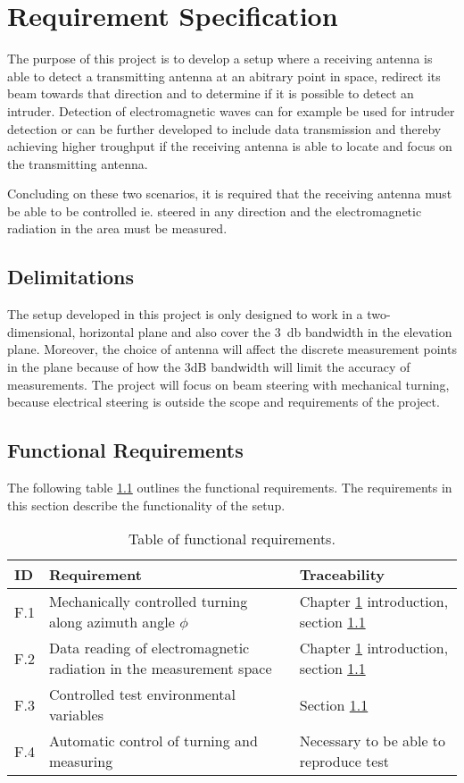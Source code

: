 \chapter{Requirement Specification} \label{ch:req}
The purpose of this project is to develop a setup where a receiving antenna is able to detect a transmitting antenna at an abitrary point in space, redirect its beam towards that direction and to determine if it is possible to detect an intruder. Detection of electromagnetic waves can for example be used for intruder detection or can be further developed to include data transmission and thereby achieving higher troughput if the receiving antenna is able to locate and focus on the transmitting antenna. 

Concluding on these two scenarios, it is required that the receiving antenna must be able to be controlled ie. steered in any direction and the electromagnetic radiation in the area must be measured. 

\section{Delimitations} \label{sec:delimitations}
The setup developed in this project is only designed to work in a two-dimensional, horizontal plane and also cover the \SI{3}{\decibel} bandwidth in the elevation plane. Moreover, the choice of antenna will affect the discrete measurement points in the plane because of how the 3dB bandwidth will limit the accuracy of measurements. The project will focus on beam steering with mechanical turning, because electrical steering is outside the scope and requirements of the project.

\section{Functional Requirements}
The following table \ref{tab:func_req} outlines the functional requirements. The requirements in this section describe the functionality of the setup.
\begin{table}[H]
    \centering
    \begin{tabular}{p{}|>{\raggedright}p{}|p{}}
        \textbf{ID} & \textbf{Requirement} & \textbf{Traceability} \\
        \hline
        \hline
        F.1 & Mechanically controlled turning along azimuth angle $\phi$ & Chapter \ref{ch:req} introduction, section \ref{sec:delimitations} \\
        F.2 & Data reading of electromagnetic radiation in the measurement space & Chapter \ref{ch:req} introduction, section \ref{sec:delimitations} \\
        F.3 & Controlled test environmental variables & Section \ref{sec:delimitations} \\
        F.4 & Automatic control of turning and measuring & Necessary to be able to reproduce test \\
    \end{tabular}
    \caption{Table of functional requirements.}
    \label{tab:func_req}
\end{table}

